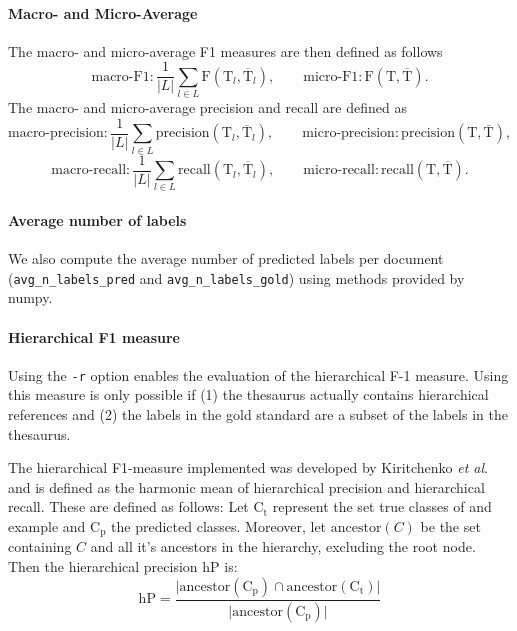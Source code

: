 \documentclass{article}
\newcommand\etal{\textit{et al}.\;}
\begin{document}
\paragraph{Macro- and Micro-Average}
The macro- and micro-average F1 measures are then defined as follows
\begin{equation*}
\textrm{macro-F1} : \frac{1}{|L|} \sum\limits_{l \in L} \mathrm{F}(\mathrm{T}_{l},\overline{\mathrm{T}}_{l}),
\qquad
\textrm{micro-F1} : \mathrm{F}(\mathrm{T},\overline{\mathrm{T}}).
\end{equation*}
The macro- and micro-average precision and recall are defined as
\begin{equation*}
\textrm{macro-precision} : \frac{1}{|L|} \sum\limits_{l \in L} \mathrm{precision}(\mathrm{T}_{l},\overline{\mathrm{T}}_{l}),
\qquad
\textrm{micro-precision} : \mathrm{precision}(\mathrm{T},\overline{\mathrm{T}}),
\end{equation*}
\begin{equation*}
\textrm{macro-recall} : \frac{1}{|L|} \sum\limits_{l \in L} \mathrm{recall}(\mathrm{T}_{l},\overline{\mathrm{T}}_{l}),
\qquad
\textrm{micro-recall} : \mathrm{recall}(\mathrm{T},\overline{\mathrm{T}}).
\end{equation*}

\paragraph{Average number of labels}
We also compute the average number of predicted labels per document (\texttt{avg\_n\_labels\_pred} and \texttt{avg\_n\_labels\_gold})
using methods provided by numpy.

\paragraph{Hierarchical F1 measure}
Using the \texttt{-r} option enables the evaluation of the hierarchical F-1 measure.
Using this measure is only possible if (1) the thesaurus actually contains hierarchical references
and (2) the labels in the gold standard are a subset of the labels in the thesaurus.

The hierarchical F1-measure implemented was developed by Kiritchenko \etal \cite{Kiritchenko04familihierarchical}
and is defined as the harmonic mean of hierarchical precision and hierarchical recall.
These are defined as follows:
Let $\mathrm{C}_\mathrm{t}$ represent the set true classes of and example and $\mathrm{C}_\mathrm{p}$ the predicted classes.
Moreover, let $\mathrm{ancestor}(C)$ be the set containing $C$ and all it's ancestors in the hierarchy,
excluding the root node.
Then the hierarchical precision $\mathrm{hP}$ is:
\[\mathrm{hP} = \frac{\vert \mathrm{ancestor}(\mathrm{C}_\mathrm{p}) \cap \mathrm{ancestor}(\mathrm{C}_\mathrm{t})\vert}{\vert \mathrm{ancestor}(\mathrm{C}_\mathrm{p})\vert}\]
\end{document}
